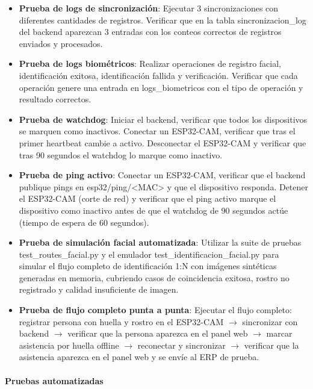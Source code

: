\begin{itemize}
    \item \textbf{Prueba de logs de sincronización}: Ejecutar 3 sincronizaciones con diferentes cantidades de registros. Verificar que en la tabla sincronizacion\_log del backend aparezcan 3 entradas con los conteos correctos de registros enviados y procesados.

    \item \textbf{Prueba de logs biométricos}: Realizar operaciones de registro facial, identificación exitosa, identificación fallida y verificación. Verificar que cada operación genere una entrada en logs\_biometricos con el tipo de operación y resultado correctos.

    \item \textbf{Prueba de watchdog}: Iniciar el backend, verificar que todos los dispositivos se marquen como inactivos. Conectar un ESP32-CAM, verificar que tras el primer heartbeat cambie a activo. Desconectar el ESP32-CAM y verificar que tras 90 segundos el watchdog lo marque como inactivo.

    \item \textbf{Prueba de ping activo}: Conectar un ESP32-CAM, verificar que el backend publique pings en esp32/ping/<MAC> y que el dispositivo responda. Detener el ESP32-CAM (corte de red) y verificar que el ping activo marque el dispositivo como inactivo antes de que el watchdog de 90 segundos actúe (tiempo de espera de 60 segundos).

    \item \textbf{Prueba de simulación facial automatizada}: Utilizar la suite de pruebas test\_routes\_facial.py y el emulador test\_identificacion\_facial.py para simular el flujo completo de identificación 1:N con imágenes sintéticas generadas en memoria, cubriendo casos de coincidencia exitosa, rostro no registrado y calidad insuficiente de imagen.

    \item \textbf{Prueba de flujo completo punta a punta}: Ejecutar el flujo completo: registrar persona con huella y rostro en el ESP32-CAM $\rightarrow$ sincronizar con backend $\rightarrow$ verificar que la persona aparezca en el panel web $\rightarrow$ marcar asistencia por huella offline $\rightarrow$ reconectar y sincronizar $\rightarrow$ verificar que la asistencia aparezca en el panel web y se envíe al ERP de prueba.
\end{itemize}

\paragraph{Pruebas automatizadas}


